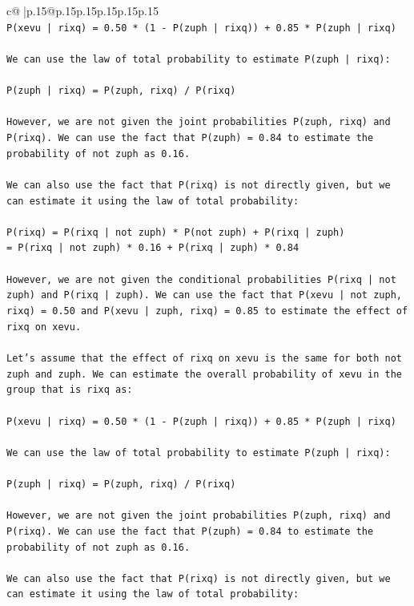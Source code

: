 \documentclass{article}
\begin{document}
{\begin{supertabular}{c@{$\;$}|p{.15\linewidth}@{}p{.15\linewidth}p{.15\linewidth}p{.15\linewidth}p{.15\linewidth}p{.15\linewidth}}
{{{\\ 
\texttt{P(xevu | rixq) = 0.50 * (1 {-} P(zuph | rixq)) + 0.85 * P(zuph | rixq)} \\
\\ 
\texttt{We can use the law of total probability to estimate P(zuph | rixq):} \\
\\ 
\texttt{P(zuph | rixq) = P(zuph, rixq) / P(rixq)} \\
\\ 
\texttt{However, we are not given the joint probabilities P(zuph, rixq) and P(rixq). We can use the fact that P(zuph) = 0.84 to estimate the probability of not zuph as 0.16.} \\
\\ 
\texttt{We can also use the fact that P(rixq) is not directly given, but we can estimate it using the law of total probability:} \\
\\ 
\texttt{P(rixq) = P(rixq | not zuph) * P(not zuph) + P(rixq | zuph)} \\
\texttt{= P(rixq | not zuph) * 0.16 + P(rixq | zuph) * 0.84} \\
\\ 
\texttt{However, we are not given the conditional probabilities P(rixq | not zuph) and P(rixq | zuph). We can use the fact that P(xevu | not zuph, rixq) = 0.50 and P(xevu | zuph, rixq) = 0.85 to estimate the effect of rixq on xevu.} \\
\\ 
\texttt{Let's assume that the effect of rixq on xevu is the same for both not zuph and zuph. We can estimate the overall probability of xevu in the group that is rixq as:} \\
\\ 
\texttt{P(xevu | rixq) = 0.50 * (1 {-} P(zuph | rixq)) + 0.85 * P(zuph | rixq)} \\
\\ 
\texttt{We can use the law of total probability to estimate P(zuph | rixq):} \\
\\ 
\texttt{P(zuph | rixq) = P(zuph, rixq) / P(rixq)} \\
\\ 
\texttt{However, we are not given the joint probabilities P(zuph, rixq) and P(rixq). We can use the fact that P(zuph) = 0.84 to estimate the probability of not zuph as 0.16.} \\
\\ 
\texttt{We can also use the fact that P(rixq) is not directly given, but we can estimate it using the law of total probability:} \\
}}}
\end{supertabular}}
\end{document}
